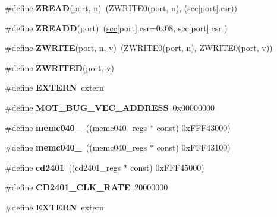 \begin{DoxyCompactItemize}
\#define {\bfseries Z\+R\+E\+AD}(port,  n)~(Z\+W\+R\+I\+T\+E0(port, n), (\mbox{\hyperlink{structscc}{scc}}\mbox{[}port\mbox{]}.csr))
\item 
\mbox{\label{group__RTEMSBSPsM68kMVME162_ga07b741ecfaa22709838228bfd86d0055}} 
\#define {\bfseries Z\+R\+E\+A\+DD}(port)~(\mbox{\hyperlink{structscc}{scc}}\mbox{[}port\mbox{]}.csr=0x08, scc\mbox{[}port\mbox{]}.\+csr )
\item 
\mbox{\label{group__RTEMSBSPsM68kMVME162_ga1ed6db60cf74893c3ad6d6da7c884e1d}} 
\#define {\bfseries Z\+W\+R\+I\+TE}(port,  n,  \mbox{\hyperlink{sun4u_2tte_8h_a0b943bd7a9fc74d6635879a38dc16894}{v}})~(Z\+W\+R\+I\+T\+E0(port, n), Z\+W\+R\+I\+T\+E0(port, \mbox{\hyperlink{sun4u_2tte_8h_a0b943bd7a9fc74d6635879a38dc16894}{v}}))
\item 
\#define {\bfseries Z\+W\+R\+I\+T\+ED}(port,  \mbox{\hyperlink{sun4u_2tte_8h_a0b943bd7a9fc74d6635879a38dc16894}{v}})
\item 
\mbox{\label{group__RTEMSBSPsM68kMVME162_ga77366c1bd428629dc898e188bfd182a3}} 
\#define {\bfseries E\+X\+T\+E\+RN}~extern
\item 
\mbox{\label{group__RTEMSBSPsM68kMVME162_ga6096c8d9cd7455c2ec7271fd03ca731f}} 
\#define {\bfseries M\+O\+T\+\_\+B\+U\+G\+\_\+\+V\+E\+C\+\_\+\+A\+D\+D\+R\+E\+SS}~0x00000000
\item 
\mbox{\label{group__RTEMSBSPsM68kMVME162_ga7b82d04847a8bd598ef2aa121b26522f}} 
\#define {\bfseries memc040\+\_}~((memc040\+\_\+regs $\ast$ const) 0x\+F\+F\+F43000)
\item 
\mbox{\label{group__RTEMSBSPsM68kMVME162_gac8f7473e846c2744a8b945459247b597}} 
\#define {\bfseries memc040\+\_}~((memc040\+\_\+regs $\ast$ const) 0x\+F\+F\+F43100)
\item 
\mbox{\label{group__RTEMSBSPsM68kMVME162_ga74b8ce2570a4ee94fc72c8b439ab2bbb}} 
\#define {\bfseries cd2401}~((cd2401\+\_\+regs $\ast$ const) 0x\+F\+F\+F45000)
\item 
\mbox{\label{group__RTEMSBSPsM68kMVME162_ga6e34d82927e1114718b7a62295ba47e7}} 
\#define {\bfseries C\+D2401\+\_\+\+C\+L\+K\+\_\+\+R\+A\+TE}~20000000
\item 
\mbox{\label{group__RTEMSBSPsM68kMVME162_ga77366c1bd428629dc898e188bfd182a3}} 
\#define {\bfseries E\+X\+T\+E\+RN}~extern
\end{DoxyCompactItemize}
